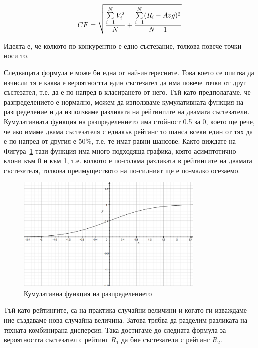 \documentclass[a4paper,12pt]{article}
\begin{document}
  \begin{equation}
    CF = \sqrt{\\
      \frac{\sum\limits_{i=1}^{N}V_i^2}{N}\\
      +\\
      \frac{\sum\limits_{i=1}^{N}(R_i-Avg)^2}{N - 1}\\
    }
  \end{equation}
  
  Идеята е, че колкото по-конкурентно е едно състезание, толкова повече точки носи то.
  
  Следващата формула е може би една от най-интересните. Това което се опитва да изчисли тя е каква е вероятността един състезател да има повече точки от друг състезател, т.е. да е по-напред в класирането от него. Тъй като предполагаме, че разпределението е нормално, можем да използваме кумулативната функция на разпределение и да използваме разликата на рейтингите на двамата състезатели. Кумулативната функция на разпределението има стойност 0.5 за 0, което ще рече, че ако имаме двама състезателя с еднакъв рейтинг то шанса всеки един от тях да е по-напред от другия е 50\%, т.е. те имат равни шансове. Както виждате на Фигура~\ref{cdf_function} тази функция има много подходяща графика, която асимптотично клони към 0 и към 1, т.е. колкото е по-голяма разликата в рейтингите на двамата състезателя, толкова преимуществото на по-силният ще е по-малко осезаемо.
  
  \begin{figure}
    \begin{center}
      \includegraphics[width=0.8\textwidth]{images/cumulative_dist_f.png}
    \end{center}
    \caption{Кумулативна функция на разпределението}
    \label{cdf_function}
  \end{figure}
  
  Тъй като рейтингите, са на практика случайни величини и когато ги изваждаме ние създаваме нова случайна величина. Затова трябва да разделим разликата на тяхната комбинирана дисперсия. Така достигаме до следната формула за вероятността състезател с рейтинг \(R_1\) да бие състезатели с рейтинг \(R_2\).
  
\end{document}
